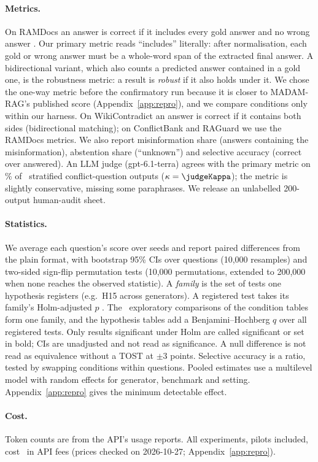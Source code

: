 \paragraph{Metrics.}
On RAMDocs an answer is correct if it includes every gold answer and no wrong answer \citep{wang2025madam}. Our primary
metric reads ``includes'' literally: after normalisation, each gold or wrong answer must be a whole-word span
of the extracted final answer. A bidirectional variant, which also counts a predicted answer contained in a gold one,
is the robustness metric: a result is \emph{robust} if it also holds under it. We chose the one-way metric before the confirmatory run because it is closer to MADAM-RAG's
published score (Appendix~\ref{app:repro}), and we compare conditions only within our harness. On WikiContradict
an answer is correct if it contains both sides (bidirectional matching); on ConflictBank and RAGuard we use the RAMDocs metrics. We also report
misinformation share (answers containing the misinformation), abstention share (``unknown'') and selective accuracy
(correct over answered). An LLM judge (gpt-6.1-terra) agrees with the primary metric on \judgeAgree\% of \judgeN\ stratified
conflict-question outputs ($\kappa=\judgeKappa$); the metric is slightly conservative, missing some paraphrases. We
release an unlabelled 200-output human-audit sheet.

\paragraph{Statistics.}
We average each question's score over seeds and report paired differences from the plain format, with
bootstrap 95\% CIs over questions (10,000 resamples) and two-sided sign-flip permutation tests
\citep{efron1993bootstrap,dror2018hitchhiker} (10,000 permutations, extended to 200,000 when none reaches the observed
statistic). A \emph{family} is the set of tests one hypothesis registers (e.g.\ H15 across generators). A registered
test takes its family's Holm-adjusted $p$ \citep{holm1979simple}. The \nExploratory\ exploratory comparisons of the
condition tables form one family, and the hypothesis tables add a Benjamini--Hochberg $q$ over all registered tests.
Only results significant under Holm are called significant or set in bold; CIs are unadjusted and not read as
significance. A null difference is not read
as equivalence without a TOST \citep{lakens2017equivalence} at $\pm$3 points. Selective accuracy is a ratio, tested by swapping conditions within questions. Pooled estimates use a multilevel model with random
effects for generator, benchmark and setting. Appendix~\ref{app:repro} gives the minimum detectable effect.

\paragraph{Cost.}
Token counts are from the API's usage reports. All experiments, pilots included, cost \totalSpend\ in API fees
(prices checked on 2026-10-27; Appendix~\ref{app:repro}).
